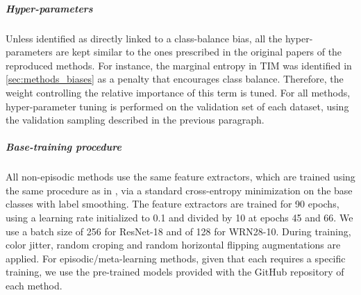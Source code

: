     \subparagraph{Hyper-parameters}

        Unless identified as directly linked to a class-balance bias, all the hyper-parameters are kept similar to the ones prescribed in the original papers of the reproduced methods. For instance, the marginal entropy in TIM \cite{malik2020Tim} was identified in \autoref{sec:methods_biases} as a penalty that encourages class balance. Therefore, the weight controlling the relative importance of this term is tuned. For all methods, hyper-parameter tuning is performed on the validation set of each dataset, using the validation sampling described in the previous paragraph.


    \subparagraph{Base-training procedure}

        All non-episodic methods use the same feature extractors, which are trained using the same procedure as in \cite{malik2020Tim,Laplacian}, via a standard cross-entropy minimization on the base classes with label smoothing. 
The feature extractors are trained for 90 epochs, using a learning rate initialized to 0.1 and divided by 10 at epochs 45 and 66. We use a batch size of 256 for ResNet-18 and of 128 for WRN28-10. 
During training, color jitter, random croping and random horizontal flipping augmentations are applied. For episodic/meta-learning methods, given that each requires a specific training, we use the pre-trained models provided with the GitHub repository of each method.

